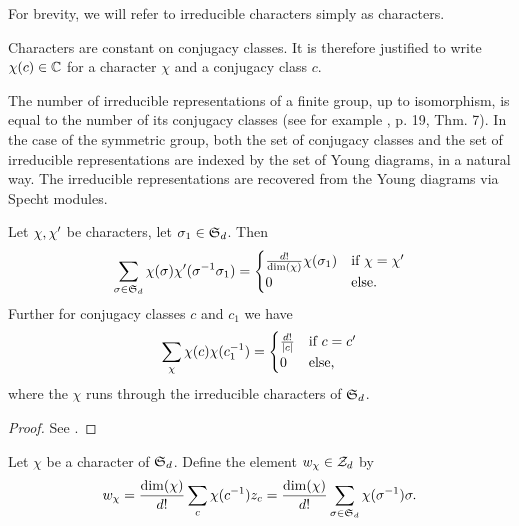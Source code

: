 For brevity, we will refer to irreducible characters simply as characters. 

\begin{rmk}
 Characters are constant on conjugacy classes. It is therefore justified to write $\chi(c)\in\mathbb{C}$ for a character $\chi$ and a conjugacy class $c$.
\end{rmk}

\begin{rmk}
 The number of irreducible representations of a finite group, up to isomorphism, is equal to the number of its conjugacy classes (see for example \cite{Serre77}, p. 19, Thm. 7). In the case of the symmetric group, both the set of conjugacy classes and the set of irreducible representations are indexed by the set of Young diagrams, in a natural way. The irreducible representations are recovered from the Young diagrams via Specht modules.
\end{rmk}

\begin{prop}\label{pr:orthogonalities}
 Let $\chi, \chi'$ be characters, let $\sigma_1\in\operatorname{\mathfrak{S}}_d$. Then
 \[
  \sum_{\sigma\in\operatorname{\mathfrak{S}}_d}\chi(\sigma)\chi'(\sigma^{-1}\sigma_1) = 
   \begin{cases} \frac{d!}{\dim(\chi)}\chi(\sigma_1) &\mbox{if } \chi = \chi' \\
                                     0 &\mbox{else.}
   \end{cases} 
 \]
 Further for conjugacy classes $c$ and $c_1$ we have
 \[
  \sum_{\chi}\chi(c)\chi(c_1^{-1}) =
   \begin{cases} \frac{d!}{|c|} &\mbox{if } c = c' \\
                                  0 &\mbox{else,}
   \end{cases}
 \]
 where the $\chi$ runs through the irreducible characters of $\operatorname{\mathfrak{S}}_d$.
\end{prop}
\begin{proof}
 See \cite[Thm.\ 2.13 and Thm.\ 2.18]{Isaacs}.
\end{proof}

\begin{defi}
 Let $\chi$ be a character of $\operatorname{\mathfrak{S}}_d$. Define the element $w_\chi \in \mathcal{Z}_d$ by
 \[
  w_\chi = \frac{\dim(\chi)}{d!}\sum_{c}\chi(c^{-1})z_c = \frac{\dim(\chi)}{d!}\sum_{\sigma\in\operatorname{\mathfrak{S}}_d}\chi(\sigma^{-1})\sigma.
 \]
\end{defi}

